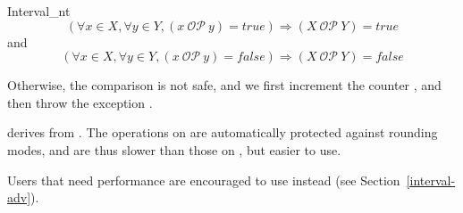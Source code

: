 \begin{ccRefClass}{Interval_nt}
$$
\left(\forall x \in X, \forall y \in Y, (x\ \mathcal{OP}\ y) = true\right)
\Rightarrow (X\ \mathcal{OP}\ Y) = true
$$
and
$$
\left(\forall x \in X, \forall y \in Y, (x\ \mathcal{OP}\ y) = false\right)
\Rightarrow (X\ \mathcal{OP}\ Y) =false
$$

Otherwise, the comparison is not safe, and we first increment the counter
, and then throw the exception
.

\ccImplementation

 derives from .
The operations on  are automatically protected against
rounding modes, and are thus slower than those on ,
but easier to use.

Users that need performance are encouraged to use 
instead (see Section~\ref{interval-adv}).

\end{ccRefClass}

